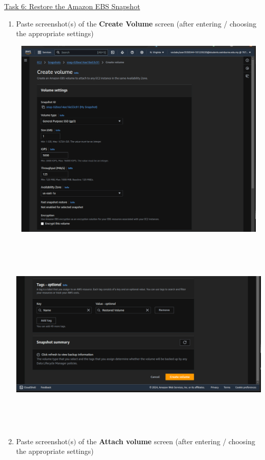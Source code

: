 \documentclass[11pt]{article}
\begin{document}
\noindent\underline{Task 6: Restore the Amazon EBS Snapshot}
\begin{enumerate}[resume]
    \item Paste screenshot$($s$)$ of the \textbf{Create Volume} screen (after entering / choosing the appropriate settings) \\
    \vspace{5mm}

    {\centering
    \includegraphics[width=6.1in, height=3.8in]{pics/10a.png}
    }


    {\centering
    \includegraphics[width=6.1in, height=3.8in]{pics/10b.png}
    }


    \item Paste screenshot$($s$)$ of the \textbf{Attach volume} screen (after entering / choosing the appropriate settings) \\
    \vspace{5mm}


\end{enumerate}
\end{document}
